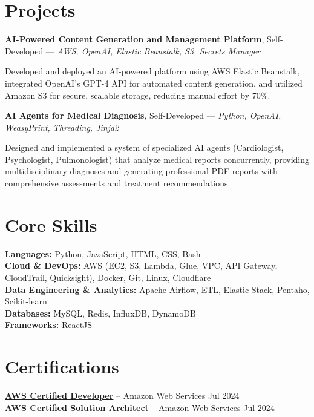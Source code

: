 \documentclass[10pt, letterpaper]{article}
\begin{document}
\section{Projects}
\textbf{\textcolor{myNavy}{AI-Powered Content Generation and Management Platform}}, Self-Developed — \textit{\textcolor{myBlue}{AWS, OpenAI, Elastic Beanstalk, S3, Secrets Manager}}

Developed and deployed an AI-powered platform using AWS Elastic Beanstalk, integrated OpenAI's GPT-4 API for automated content generation, and utilized Amazon S3 for secure, scalable storage, \textcolor{myAccent}{reducing manual effort by 70\%}.

\vspace{0.05cm}

\textbf{\textcolor{myNavy}{AI Agents for Medical Diagnosis}}, Self-Developed — \textit{\textcolor{myBlue}{Python, OpenAI, WeasyPrint, Threading, Jinja2}}

Designed and implemented a system of specialized AI agents (Cardiologist, Psychologist, Pulmonologist) that analyze medical reports concurrently, providing multidisciplinary diagnoses and generating professional PDF reports with comprehensive assessments and treatment recommendations.

\vspace{0.08cm}

\section{Core Skills}
\textbf{\textcolor{myNavy}{Languages:}} Python, JavaScript, HTML, CSS, Bash \\
\textbf{\textcolor{myNavy}{Cloud \& DevOps:}} AWS (EC2, S3, Lambda, Glue, VPC, API Gateway, CloudTrail, Quicksight), Docker, Git, Linux, Cloudflare \\
\textbf{\textcolor{myNavy}{Data Engineering \& Analytics:}} Apache Airflow, ETL, Elastic Stack, Pentaho, Scikit-learn \\
\textbf{\textcolor{myNavy}{Databases:}} MySQL, Redis, InfluxDB, DynamoDB \\
\textbf{\textcolor{myNavy}{Frameworks:}} ReactJS

\vspace{0.08cm}

\section{Certifications}
\textbf{\href{https://cp.certmetrics.com/amazon/en/public/verify/credential/dc7c20379cf94f2699a4d430c31ac969}{AWS Certified Developer}} -- Amazon Web Services \hfill \textcolor{myDarkGray}{Jul 2024} \\
\textbf{\href{https://cp.certmetrics.com/amazon/en/public/verify/credential/7ec7fce4db1f4b1bab3b6f8caa3f509b}{AWS Certified Solution Architect}} -- Amazon Web Services \hfill \textcolor{myDarkGray}{Jul 2024}
\end{document}
